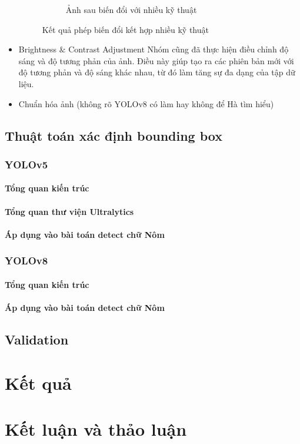 \documentclass[a4paper,12pt]{article}
\begin{document}
\begin{itemize}
\begin{figure}[H]
\begin{subfigure}{.4\textwidth}
          \caption{Ảnh sau biến đổi với nhiều kỹ thuật}
        \end{subfigure}
        \caption{Kết quả phép biến đổi kết hợp nhiều kỹ thuật}
    \end{figure}
    \item Brightness $\&$ Contrast Adjustment
    Nhóm cũng đã thực hiện điều chỉnh độ sáng và độ tương phản của ảnh. Điều này giúp tạo ra các phiên bản mới với độ tương phản và độ sáng khác nhau, từ đó làm tăng sự đa dạng của tập dữ liệu.
    \item Chuẩn hóa ảnh (không rõ YOLOv8 có làm hay không để Hà tìm hiểu)
\end{itemize}
\subsection{Thuật toán xác định bounding box}
\subsubsection{YOLOv5}
\paragraph{Tổng quan kiến trúc}
\paragraph{Tổng quan thư viện Ultralytics}
\paragraph{Áp dụng vào bài toán detect chữ Nôm}
\subsubsection{YOLOv8}
\paragraph{Tổng quan kiến trúc}
\paragraph{Áp dụng vào bài toán detect chữ Nôm}
\subsection{Validation}
\section{Kết quả}
\section{Kết luận và thảo luận}
\end{document}
